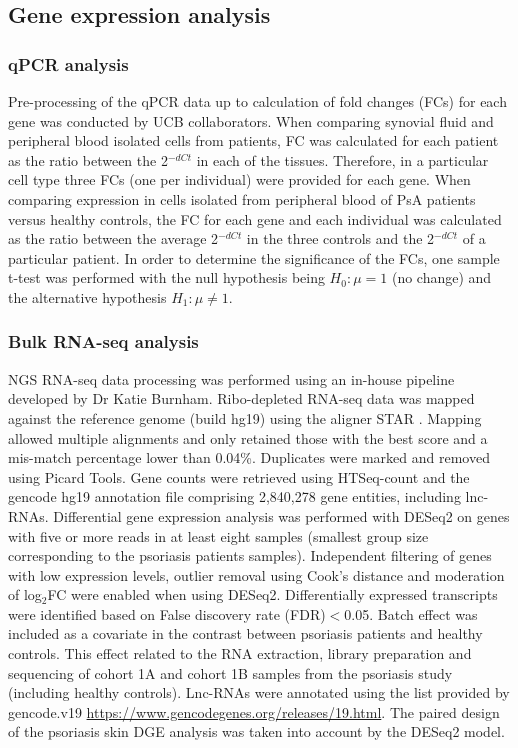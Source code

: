 \subsection{Gene expression analysis}

\subsubsection{qPCR analysis}
Pre-processing of the qPCR data up to calculation of fold changes (FCs) for each gene was conducted by UCB collaborators. When comparing synovial fluid and peripheral blood isolated cells from patients, FC was calculated for each patient as the ratio between the 2$^{-dCt}$ in each of the tissues. Therefore, in a particular cell type three FCs (one per individual) were provided for each gene. When comparing expression in cells isolated from peripheral blood of PsA patients versus healthy controls, the FC for each gene and each individual was calculated as the ratio between the average 2$^{-dCt}$ in the three controls and the 2$^{-dCt}$ of a particular patient. In order to determine the significance of the FCs, one sample t-test was performed with the null hypothesis being $H_0:\mu=1$ (no change) and the alternative hypothesis $H_1:\mu\neq 1$. 


\subsubsection{Bulk RNA-seq analysis}
NGS RNA-seq data processing was performed using an in-house pipeline developed by Dr Katie Burnham. Ribo-depleted RNA-seq data was mapped against the reference genome (build hg19) using the aligner STAR \parencite{Dobin2013}. Mapping allowed multiple alignments and only retained those with the best score and a mis-match percentage lower than 0.04\%. Duplicates were marked and removed using Picard Tools. Gene counts were retrieved using HTSeq-count and the gencode hg19 annotation file comprising 2,840,278 gene entities, including lnc-RNAs. Differential gene expression analysis was performed with DESeq2 on genes with five or more reads in at least eight samples (smallest group size corresponding to the psoriasis patients samples). Independent filtering of genes with low expression levels, outlier removal using Cook's distance and moderation of log$_2$FC were enabled when using DESeq2. Differentially expressed transcripts were identified based on False discovery rate (FDR)$<$0.05. Batch effect was included as a covariate in the contrast between psoriasis patients and healthy controls. This effect related to the RNA extraction, library preparation and sequencing of cohort 1A and cohort 1B samples from the psoriasis study (including healthy controls). Lnc-RNAs were annotated using the list provided by gencode.v19 \url{https://www.gencodegenes.org/releases/19.html}. The paired design of the psoriasis skin DGE analysis was taken into account by the DESeq2 model.



